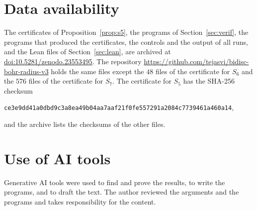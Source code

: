 \documentclass[11pt]{amsart}
\theoremstyle{remark}
\numberwithin{equation}{section}
\newcommand{\SUPPDOI}{10.5281/zenodo.23553495}
\newcommand{\NFilesSeven}{576}
\begin{document}
\section*{Data availability}
The certificates of Proposition~\ref{prop:s5}, the programs of Section~\ref{sec:verif}, the programs that produced the certificates, the controls and the output of all runs, and the Lean files of Section~\ref{sec:lean}, are archived at \href{https://doi.org/\SUPPDOI}{doi:\SUPPDOI}. The repository \url{https://github.com/tejasvi/bidisc-bohr-radius-v3} holds the same files except the $48$ files of the certificate for $S_6$ and the $\NFilesSeven$ files of the certificate for $S_7$. The certificate for $S_5$ has the SHA-256 checksum
\begin{center}
\texttt{ce3e9dd41a0dbd9c3a8ea49b04aa7aaf21f0fe557291a2084c7739461a460a14},
\end{center}
and the archive lists the checksums of the other files.

\section*{Use of AI tools}
Generative AI tools were used to find and prove the results, to write the programs, and to draft the text. The author reviewed the arguments and the programs and takes responsibility for the content.
\end{document}
